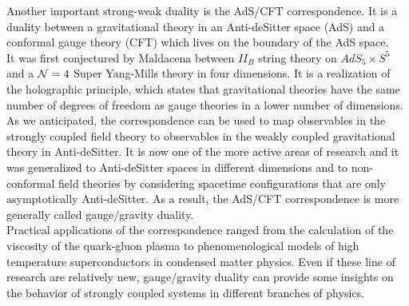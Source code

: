 Another important strong-weak duality is the AdS/CFT correspondence. 
It is a duality  between a gravitational theory in an Anti-deSitter space (AdS) and a conformal gauge theory (CFT) which lives on the boundary of the AdS space. \\
It was first conjectured by Maldacena \cite{Maldacena:1997re} between $II_B$ string theory on $AdS_5 \times S^5$ and a $\mathcal{N}=4$ Super Yang-Mills theory in four dimensions. 
It is a realization of the holographic principle, which states that gravitational theories have the same number of degrees of freedom as gauge theories in a lower number of dimensions.\\
As we anticipated, the correspondence can be used to map observables in the strongly coupled field theory to observables in the weakly coupled gravitational theory in Anti-deSitter.
It is now one of the more active areas of research and it was generalized to Anti-deSitter spaces in different dimensions and to non-conformal field theories by considering spacetime configurations that are only asymptotically Anti-deSitter.
As a result, the AdS/CFT correspondence is more generally called gauge/gravity duality.  \\
Practical applications of the correspondence ranged from the calculation of the viscosity of the quark-gluon plasma to phenomenological models of high temperature superconductors in condensed matter physics.
Even if these line of research are relatively new, gauge/gravity duality can provide some insights on the behavior of strongly coupled systems in different branches of physics.   
\\ 



